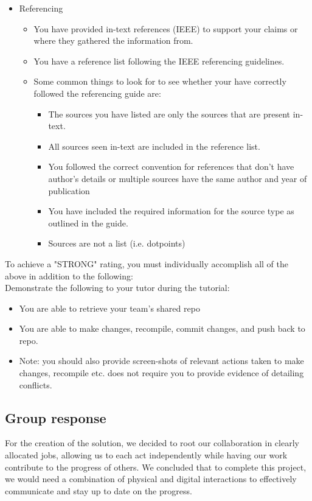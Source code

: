 \documentclass[a4paper, 11pt]{report}
\begin{document}
\begin{itemize}
\begin{itemize}
	\end{itemize}
\item Referencing
	\begin{itemize}
	\item You have provided in-text references (IEEE) to support your claims or where they gathered the information from.
	\item You have a reference list following the IEEE referencing guidelines.
	\item Some common things to look for to see whether your have correctly followed the referencing guide are:
		\begin{itemize}
		\item The sources you have listed are only the sources that are present in-text.
		\item All sources seen in-text are included in the reference list.
		\item You followed the correct convention for references that don’t have author’s details or multiple sources have the same author and year of publication
		\item You have included the required information for the source type as outlined in the guide.
		\item Sources are not a list (i.e. dotpoints)
		\end{itemize}
	\end{itemize}
\end{itemize}

To achieve a "STRONG" rating, you must individually accomplish all of the above in addition to the following:\\
Demonstrate the following to your tutor during the tutorial:
\begin{itemize}
\item You are able to retrieve your team’s shared repo
\item You are able to make changes, recompile, commit changes, and push back to repo.
\item Note: you should also provide screen-shots of relevant actions taken to make changes, recompile etc. does not require you to provide evidence of detailing conflicts.
\end{itemize}


\subsection{Group response}

For the creation of the solution, we decided to root our collaboration in clearly allocated jobs, allowing us to each act independently while having our work contribute to the progress of others. We concluded that to complete this project, we would need a combination of physical and digital interactions to effectively communicate and stay up to date on the progress.
\end{document}
